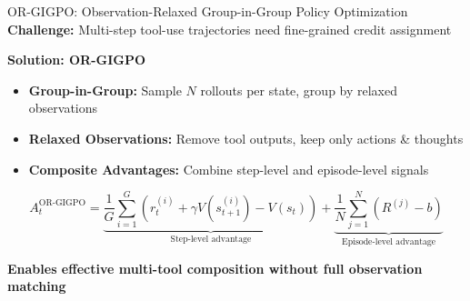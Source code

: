 \documentclass[aspectratio=169,xcolor=dvipsnames]{beamer}
\begin{document}
\begin{frame}{OR-GIGPO: Observation-Relaxed Group-in-Group Policy Optimization}
\textbf{Challenge:} Multi-step tool-use trajectories need fine-grained credit assignment

\vspace{0.5em}

\textbf{Solution: OR-GIGPO}
\begin{itemize}
    \item \textbf{Group-in-Group:} Sample $N$ rollouts per state, group by relaxed observations
    \item \textbf{Relaxed Observations:} Remove tool outputs, keep only actions \& thoughts
    \item \textbf{Composite Advantages:} Combine step-level and episode-level signals
\end{itemize}

\vspace{0.5em}

\begin{equation*}
A_t^{\text{OR-GIGPO}} = \underbrace{\frac{1}{G}\sum_{i=1}^G \left(r_t^{(i)} + \gamma V(s_{t+1}^{(i)}) - V(s_t)\right)}_{\text{Step-level advantage}} + \underbrace{\frac{1}{N}\sum_{j=1}^N \left(R^{(j)} - b\right)}_{\text{Episode-level advantage}}
\end{equation*}

\vspace{0.5em}

\centering
\colorbox{neuripsblue!20}{\parbox{0.85\textwidth}{\centering
\textbf{Enables effective multi-tool composition without full observation matching}
}}
\end{frame}
\end{document}
